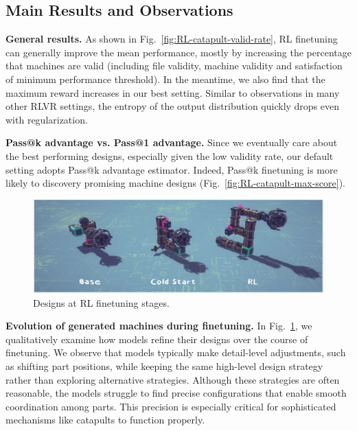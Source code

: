 \documentclass{article} %
\theoremstyle{plain}
\theoremstyle{definition}
\begin{document}
\vspace{-1.5mm}
\subsection{Main Results and Observations}
\vspace{-1mm}

\textbf{General results.} As shown in Fig.~\ref{fig:RL-catapult-valid-rate}, RL finetuning can generally improve the mean performance, mostly by increasing the percentage that machines are valid (including file validity, machine validity and satisfaction of minimum performance threshold). In the meantime, we also find that the maximum reward increases in our best setting. Similar to observations in many other RLVR settings, the entropy of the output distribution quickly drops even with regularization.

\textbf{Pass@k advantage vs. Pass@1 advantage.}
Since we eventually care about the best performing designs, especially given the low validity rate, our default setting adopts Pass@k advantage estimator. Indeed, Pass@k finetuning is more likely to discovery promising machine designs (Fig.~\ref{fig:RL-catapult-max-score}).


\begin{figure} %
  \centering
  \vspace{-4mm} %
  \includegraphics[width=\linewidth]{figures/14b_model_sample_v4_cropped.pdf}
  \captionsetup{font=footnotesize}
  \vspace{-5.5mm} %
  \caption{\footnotesize Designs at RL finetuning stages.}
  \vspace{-3mm} %
  \label{fig:rl_evolution}
\end{figure}

\textbf{Evolution of generated machines during finetuning.} In Fig.~\ref{fig:rl_evolution}, we qualitatively examine how models refine their designs over the course of finetuning. We observe that models typically make detail-level adjustments, such as shifting part positions, while keeping the same high-level design strategy rather than exploring alternative strategies. Although these strategies are often reasonable, the models struggle to find precise configurations that enable smooth coordination among parts. This precision is especially critical for sophisticated mechanisms like catapults to function properly.
\end{document}
